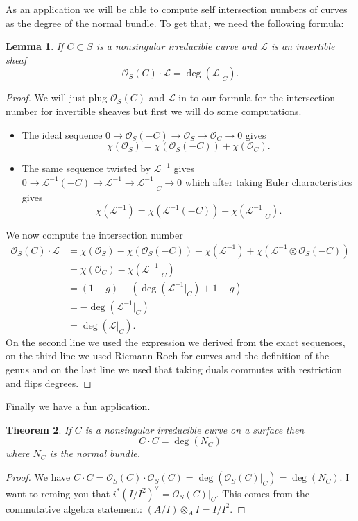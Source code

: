 \documentclass[12pt]{article}
\numberwithin{equation}{section}
\newtheorem{theorem}{Theorem}[subsection]
\newtheorem{lemma}[theorem]{Lemma}
\theoremstyle{definition}
\theoremstyle{remark}
\newcommand{\Ocal}{\mathcal{O}}
\newcommand{\Lcal}{\mathcal{L}}
\begin{document}
As an application we will be able to compute self intersection numbers of curves as the degree of the normal bundle. 
To get that, we need the following formula:
\begin{lemma}
	If $C \subset S$ is a nonsingular irreducible curve and $\Lcal$ is an invertible sheaf
	 $$ \Ocal_S(C)\cdot \Lcal = \deg(\Lcal\vert_C).$$
\end{lemma} 
\begin{proof}
	We will just plug $\Ocal_S(C)$ and $\Lcal$ in to our formula for the intersection number for invertible sheaves but first we will do some computations. 
	\begin{itemize}
		\item The ideal sequence $ 0 \to \Ocal_S(-C) \to \Ocal_S \to \Ocal_C \to 0$
		gives 
		$$\chi(\Ocal_S) = \chi(\Ocal_S(-C)) + \chi(\Ocal_C).$$
		\item The same sequence twisted by $\Lcal^{-1}$ gives $0\to \Lcal^{-1}(-C)\to\Lcal^{-1} \to \Lcal^{-1}\vert_C \to 0$ which after taking Euler characteristics gives 
		 $$ \chi(\Lcal^{-1}) = \chi(\Lcal^{-1}(-C))+\chi(\Lcal^{-1}\vert_C).$$
	\end{itemize}
	We now compute the intersection number
	\begin{align*}
	\Ocal_S(C) \cdot \Lcal &= \chi(\Ocal_S) - \chi(\Ocal_S(-C)) - \chi(\Lcal^{-1}) + \chi(\Lcal^{-1}\otimes \Ocal_S(-C)) \\
	 &=\chi(\Ocal_C) - \chi(\Lcal^{-1}\vert_C)\\
	 &= (1-g) - \left( \deg(\Lcal^{-1}\vert_C) + 1-g \right)\\
	 &= -\deg(\Lcal^{-1}\vert_C)\\
	 &= \deg(\Lcal\vert_C). 
	\end{align*}
	On the second line we used the expression we derived from the exact sequences, on the third line we used Riemann-Roch for curves and the definition of the genus and on the last line we used that taking duals commutes with restriction and flips degrees. 
\end{proof}

Finally we have a fun application. 
\begin{theorem}
	If $C$ is a nonsingular irreducible curve on a surface then 
	 $$ C\cdot C = \deg(N_C) $$
	where $N_C$ is the normal bundle. 
\end{theorem}
\begin{proof}
We have $C \cdot C = \Ocal_S(C) \cdot \Ocal_S(C) = \deg(\Ocal_S(C)\vert_C) = \deg(N_C)$.
I want to reming you that $i^*(I/I^2)^{\vee} =\Ocal_S(C)\vert_C$. 
This comes from the commutative algebra statement: $(A/I)\otimes_A I= I/I^2$.
\end{proof}
\end{document}
